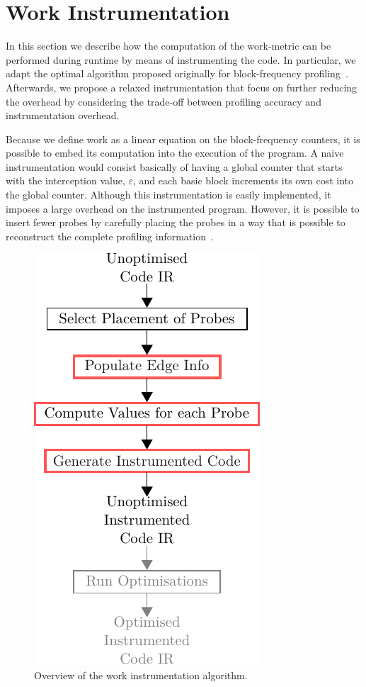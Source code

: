 \chapter{Work Instrumentation} \label{chap:instr}

In this section we describe how the computation of the work-metric can be performed during runtime by means of instrumenting the code.
In particular, we adapt the optimal algorithm proposed originally for block-frequency profiling~\citep{nahapetian73,knuth73,ball94}.
Afterwards, we propose a relaxed instrumentation that focus on further reducing the overhead by considering the trade-off between profiling accuracy and instrumentation overhead.

Because we define work as a linear equation on the block-frequency counters, it is possible to embed its computation into the execution of the program.
A naive instrumentation would consist basically of having a global counter that starts with the interception value, $\varepsilon$, and each basic block increments its own cost into the global counter.
Although this instrumentation is easily implemented, it imposes a large overhead on the instrumented program.
However, it is possible to insert fewer probes by carefully placing the probes in a way that is possible to reconstruct the complete profiling information~\cite{knuth73,ball94}.

\begin{figure}[h]
  \centering
  \includegraphics[scale=0.9]{figs/instr-diagram.pdf}
  \caption{Overview of the work instrumentation algorithm.}
  \label{fig:instr-diagram}
\end{figure}


